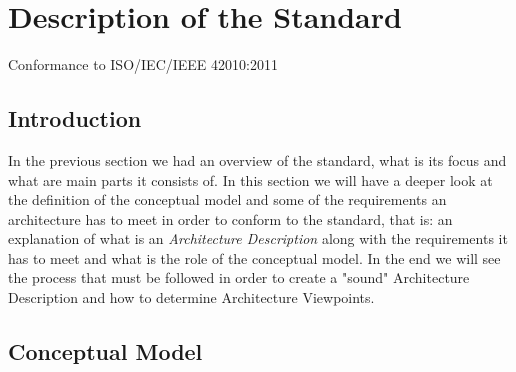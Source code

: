 \section{Description of the Standard}

	\begin{frame}
		\begin{LARGE}
			Conformance to ISO/IEC/IEEE 42010:2011
		\end{LARGE}
	\end{frame}
	
	\subsection{Introduction}
	
		\begin{frame}
			\vspace{0.3cm}
			In the previous section we had an overview of the standard, what is its focus and what are main parts it consists of.\newline\newline
			In this section we will have a deeper look at the definition of the conceptual model and some of the requirements an architecture has to meet in order to conform to the standard, that is: an explanation of what is an \emph{Architecture Description} along with the requirements it has to meet and what is the role of the conceptual model.\newline\newline
			In the end we will see the process that must be followed in order to create a "sound" Architecture Description and how to determine Architecture Viewpoints.
		\end{frame}
		
	\subsection{Conceptual Model}
	
